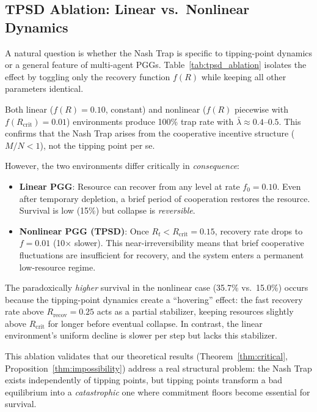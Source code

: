 \subsection{TPSD Ablation: Linear vs.\ Nonlinear Dynamics}
\label{app:tpsd_ablation}

A natural question is whether the Nash Trap is specific to tipping-point dynamics or a general feature of multi-agent PGGs. Table~\ref{tab:tpsd_ablation} isolates the effect by toggling only the recovery function $f(R)$ while keeping all other parameters identical.



Both linear ($f(R)=0.10$, constant) and nonlinear ($f(R)$ piecewise with $f(R_{\mathrm{crit}})=0.01$) environments produce 100\% trap rate with $\bar{\lambda} \approx 0.4$--$0.5$. This confirms that the Nash Trap arises from the cooperative incentive structure ($M/N < 1$), not the tipping point per se.

However, the two environments differ critically in \emph{consequence}:
\begin{itemize}
    \item \textbf{Linear PGG}: Resource can recover from any level at rate $f_0 = 0.10$. Even after temporary depletion, a brief period of cooperation restores the resource. Survival is low (15\%) but collapse is \emph{reversible}.
    \item \textbf{Nonlinear PGG (TPSD)}: Once $R_t < R_{\mathrm{crit}} = 0.15$, recovery rate drops to $f = 0.01$ (10$\times$ slower). This near-irreversibility means that brief cooperative fluctuations are insufficient for recovery, and the system enters a permanent low-resource regime.
\end{itemize}

The paradoxically \emph{higher} survival in the nonlinear case (35.7\% vs.\ 15.0\%) occurs because the tipping-point dynamics create a ``hovering'' effect: the fast recovery rate above $R_{\mathrm{recov}} = 0.25$ acts as a partial stabilizer, keeping resources slightly above $R_{\mathrm{crit}}$ for longer before eventual collapse. In contrast, the linear environment's uniform decline is slower per step but lacks this stabilizer.

This ablation validates that our theoretical results (Theorem~\ref{thm:critical}, Proposition~\ref{thm:impossibility}) address a real structural problem: the Nash Trap exists independently of tipping points, but tipping points transform a bad equilibrium into a \emph{catastrophic} one where commitment floors become essential for survival.
